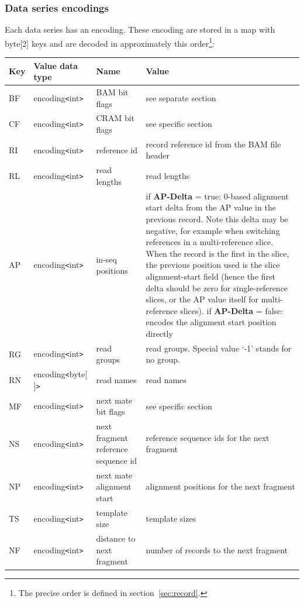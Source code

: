 \documentclass[a4paper]{article}
\begin{document}
\subsubsection*{Data series encodings}

Each data series has an encoding. These encoding are stored in a map with byte[2] 
keys and are decoded in approximately this order\footnote{The precise order is defined in section~\ref{sec:record}.}:

\begin{threeparttable}[t]
\begin{tabular}{|l|l|>{\raggedright}p{100pt}|>{\raggedright}p{220pt}|}
\hline
\textbf{Key} & \textbf{Value data type} & \textbf{Name} & \textbf{Value}\tabularnewline
\hline
BF & encoding\texttt{<}int\texttt{>} & BAM bit flags & see separate section\tabularnewline
\hline
CF & encoding\texttt{<}int\texttt{>} & CRAM bit flags & see specific section\tabularnewline
\hline
RI & encoding\texttt{<}int\texttt{>} & reference id & record reference id from
the BAM file header\tabularnewline
\hline
RL & encoding\texttt{<}int\texttt{>} & read lengths & read lengths\tabularnewline
\hline
AP & encoding\texttt{<}int\texttt{>} & in-seq positions & if \textbf{AP-Delta} = true: 0-based alignment start
delta from the AP value in the previous record.
Note this delta may be negative, for example when switching references in a multi-reference slice.
When the record is the first in the slice, the previous position used is the slice alignment-start field (hence the first delta should be zero for single-reference slices, or the AP value itself for multi-reference slices).  \linebreak{}
if \textbf{AP-Delta} = false: encodes the alignment start position directly\tabularnewline
\hline
RG & encoding\texttt{<}int\texttt{>} & read groups & read groups. Special value 
`-1' stands for no group.\tabularnewline
\hline
RN\tnote{a} & encoding\texttt{<}byte[ ]\texttt{>} & read names & read names\tabularnewline
\hline
MF & encoding\texttt{<}int\texttt{>} & next mate bit flags & see specific section\tabularnewline
\hline
NS & encoding\texttt{<}int\texttt{>} & next fragment reference sequence id & reference 
sequence ids for the next fragment \tabularnewline
\hline
NP & encoding\texttt{<}int\texttt{>} & next mate alignment start & alignment positions 
for the next fragment\tabularnewline
\hline
TS & encoding\texttt{<}int\texttt{>} & template size & template sizes\tabularnewline
\hline
NF & encoding\texttt{<}int\texttt{>} & distance to next fragment & number of records
to the next fragment\tnote{b}\tabularnewline

\end{tabular}
\end{threeparttable}
\end{document}

